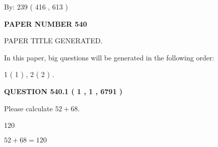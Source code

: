\documentclass[12pt]{article}
\begin{document}
   
\hspace{1.0in} By: 
 239 ( 416 ,  613 )
   
   
   
   
\newpage 
\setcounter{page}{ 
   540001 } 
   
   
   
   
 {\textbf{ \Large{ PAPER NUMBER  540  }}}
   
   
\vspace{0.2in}
   
   
   
   
   
   
   
   
 \vspace{0.2in}
 
 
 
 
   
   
 PAPER TITLE GENERATED.
   
   
   
\vspace{0.2in}
   
In this paper, big questions will be generated in the following order: 
   
   
   1 ( 1 )
 ,
   2 ( 2 )
 .
  
\vspace{0.2in}
  
{\textbf{\Large{QUESTION
540.1 
 ( 1 , 1 , 6791 )
}}}
  
  
 
Please calculate $ %
52 +  %
68 $.
 
 
 
\noindent{}
 
 

120
 
 
\noindent{}
 
 

 
 
 
\noindent{}
 
 

$ %
52 +  %
68=   %
120$
 
 
\noindent{}
 
\end{document}
